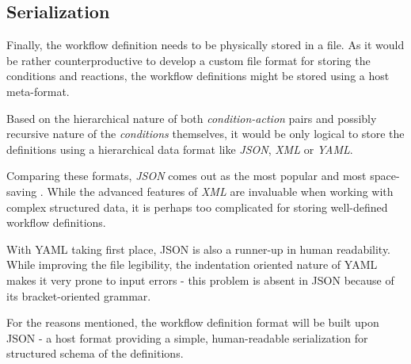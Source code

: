 
\subsection{Serialization}


Finally, the workflow definition needs to be physically stored in a file. 
As it would be rather counterproductive to develop a custom file format for storing the conditions and reactions, the workflow definitions might be stored using a host meta-format.

Based on the hierarchical nature of both \textit{condition-action} pairs and possibly recursive nature of the \textit{conditions} themselves, it would be only logical to store the definitions using a hierarchical data format like \textit{JSON}, \textit{XML} or \textit{YAML}.

Comparing these formats, \textit{JSON} comes out as the most popular  and most space-saving . 
While the advanced features of \textit{XML} are invaluable when working with complex structured data, it is perhaps too complicated for storing well-defined workflow definitions.

With YAML taking first place, JSON is also a runner-up in human readability.
While improving the file legibility, the indentation oriented nature of YAML makes it very prone to input errors - this problem is absent in JSON because of its bracket-oriented grammar.

For the reasons mentioned, the workflow definition format will be built upon JSON - a host format providing a simple, human-readable serialization for structured schema of the definitions.

\subsubsection{}